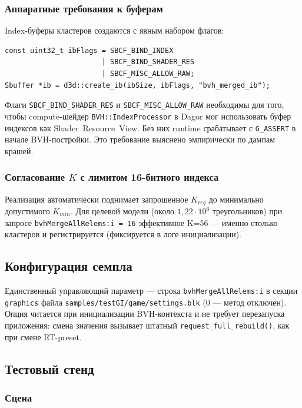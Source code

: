 \subsubsection{Аппаратные требования к буферам}

Index-буферы кластеров создаются с явным набором флагов:
\begin{verbatim}
const uint32_t ibFlags = SBCF_BIND_INDEX
                       | SBCF_BIND_SHADER_RES
                       | SBCF_MISC_ALLOW_RAW;
Sbuffer *ib = d3d::create_ib(ibSize, ibFlags, "bvh_merged_ib");
\end{verbatim}

Флаги \texttt{SBCF\_BIND\_SHADER\_RES} и
\texttt{SBCF\_MISC\_ALLOW\_RAW} необходимы для того, чтобы
compute-шейдер \texttt{BVH::IndexProcessor} в Dagor мог
использовать буфер индексов как Shader~Resource~View. Без них
runtime срабатывает с \texttt{G\_ASSERT} в начале
BVH-постройки. Это требование выяснено эмпирически по дампам
крашей.

\subsubsection{Согласование $K$ с лимитом 16-битного индекса}

Реализация автоматически поднимает запрошенное $K_{req}$ до
минимально допустимого $K_{min}$. Для целевой модели (около $1{,}22 \cdot 10^6$
треугольников) при запросе \texttt{bvhMergeAllRelems:i = 16}
эффективное K=56 --- именно столько кластеров и регистрируется
(фиксируется в логе инициализации).

\subsection{Конфигурация семпла}

Единственный управляющий параметр --- строка
\texttt{bvhMergeAllRelems:i} в секции \texttt{graphics} файла
\texttt{samples/testGI/game/settings.blk} ($0$ --- метод отключён).
Опция читается при инициализации BVH-контекста и не требует
перезапуска приложения: смена значения вызывает штатный
\texttt{request\_full\_rebuild()}, как при смене RT-preset.

\subsection{Тестовый стенд}

\subsubsection{Сцена}

